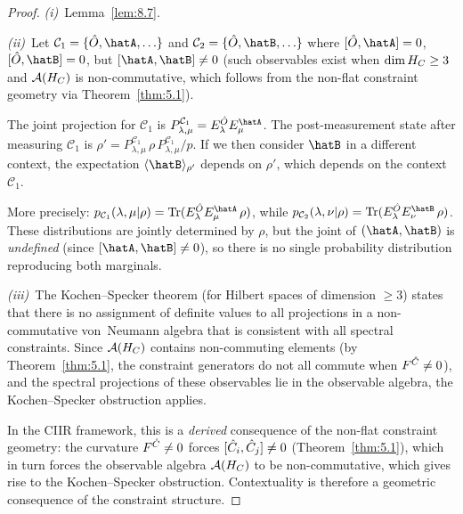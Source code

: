 \begin{proof}
\textit{(i)}~Lemma~\ref{lem:8.7}.

\textit{(ii)}~Let $\mathcal{C}_1 = \{\hatO, \hatA, \ldots\}$ and
$\mathcal{C}_2 = \{\hatO, \hatB, \ldots\}$ where $[\hatO, \hatA] = 0$,
$[\hatO, \hatB] = 0$, but $[\hatA, \hatB] \neq 0$ (such observables
exist when $\dim H_C \geq 3$ and $\mathcal{A}(H_C)$ is non-commutative, which
follows from the non-flat constraint geometry via
Theorem~\ref{thm:5.1}).

The joint projection for $\mathcal{C}_1$ is
$P^{\mathcal{C}_1}_{\lambda,\mu} = E^{\hatO}_\lambda E^{\hatA}_\mu$.
The post-measurement state after measuring $\mathcal{C}_1$ is
$\rho' = P^{\mathcal{C}_1}_{\lambda,\mu}\,\rho\,
P^{\mathcal{C}_1}_{\lambda,\mu} / p$.  If we then consider
$\hatB$ in a different context, the expectation
$\langle\hatB\rangle_{\rho'}$ depends on $\rho'$, which depends on
the context $\mathcal{C}_1$.

More precisely:
$p_{\mathcal{C}_1}(\lambda, \mu | \rho) =
\Tr(E^{\hatO}_\lambda E^{\hatA}_\mu\,\rho)$, while
$p_{\mathcal{C}_2}(\lambda, \nu | \rho) =
\Tr(E^{\hatO}_\lambda E^{\hatB}_\nu\,\rho)$.  These distributions are
jointly determined by $\rho$, but the joint of $(\hatA, \hatB)$ is
\emph{undefined} (since $[\hatA, \hatB] \neq 0$), so there is no single
probability distribution reproducing both marginals.

\textit{(iii)}~The Kochen--Specker theorem (for Hilbert spaces of
dimension $\geq 3$) states that there is no assignment of definite
values to all projections in a non-commutative von~Neumann algebra that
is consistent with all spectral constraints.  Since $\mathcal{A}(H_C)$ contains
non-commuting elements (by Theorem~\ref{thm:5.1}, the constraint
generators do not all commute when $F^{\hat{C}} \neq 0$), and the
spectral projections of these observables lie in the observable algebra,
the Kochen--Specker obstruction applies.

In the CIIR framework, this is a \emph{derived} consequence of the
non-flat constraint geometry: the curvature $F^{\hat{C}} \neq 0$ forces
$[\hat{C}_i, \hat{C}_j] \neq 0$ (Theorem~\ref{thm:5.1}), which in turn
forces the observable algebra $\mathcal{A}(H_C)$ to be non-commutative, which
gives rise to the Kochen--Specker obstruction.  Contextuality is
therefore a geometric consequence of the constraint structure.
\end{proof}


